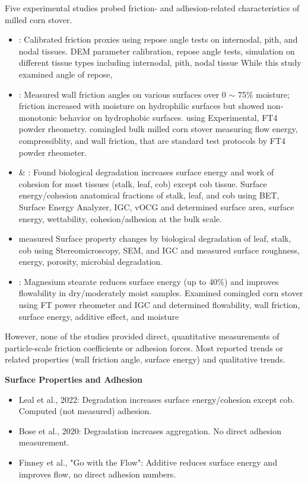 \documentclass[xcolor=dvipsnames,10pt,hidelinks]{article}
\begin{document}
Five experimental studies probed friction- and adhesion-related characteristics of milled corn stover.
\begin{itemize}
\item \textcite{fang_friction_2022} : Calibrated friction proxies using repose angle tests on internodal, pith, and nodal tissues.
DEM parameter calibration, repose angle tests, simulation on different tissue types including internodal, pith, nodal tissue
While this study examined angle of repose,
\item \textcite{cheng_effect_2022} : Measured wall friction angles on various surfaces over 0 \(\sim\) 75\% moisture; friction increased with moisture on hydrophilic surfaces but showed non-monotonic behavior on hydrophobic surfaces.
using Experimental, FT4 powder rheometry. comingled bulk milled corn stover measuring flow energy, compressiblity, and wall friction, that are standard test protocols by FT4 powder rheometer.
\item \textcite{leal_impacts_2022} \& \textcite{bose_impacts_2020} : Found biological degradation increases surface energy and work of cohesion for most tissues (stalk, leaf, cob) except cob tissue.
Surface energy/cohesion anatomical fractions of stalk, leaf, and cob using BET, Surface Energy Analyzer, IGC, vOCG and determined surface area, surface energy, wettability, cohesion/adhesion at the bulk scale.

\item \textcite{bose_impacts_2020}  measured  Surface property changes by biological degradation of leaf, stalk, cob using Stereomicroscopy, SEM, and IGC and measured surface roughness, energy, porosity, microbial degradation.

\item \textcite{finney_go_2025} : Magnesium stearate reduces surface energy (up to 40\%) and improves flowability in dry/moderately moist samples.
Examined comingled corn stover using FT power rheometer and IGC and determined flowability, wall friction, surface energy, additive effect, and moisture
\end{itemize}

However, none of the studies provided direct, quantitative measurements of particle-scale friction coefficients or adhesion forces.
Most reported trends or related properties (wall friction angle, surface energy) and qualitative trends.

\textbf{\textbf{Surface Properties and Adhesion}}
\begin{itemize}
\item Leal et al., 2022: Degradation increases surface energy/cohesion except cob. Computed (not measured) adhesion.
\item Bose et al., 2020: Degradation increases aggregation. No direct adhesion measurement.
\item Finney et al., "Go with the Flow": Additive reduces surface energy and improves flow, no direct adhesion numbers.
\end{itemize}
\end{document}

